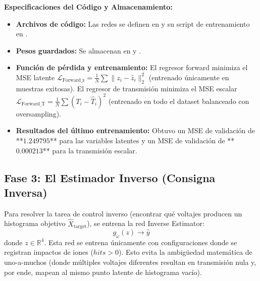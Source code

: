 \documentclass[12pt,letterpaper]{article}
\begin{document}
\textbf{Especificaciones del Código y Almacenamiento:}
\begin{itemize}
    \item \textbf{Archivos de código:} Las redes se definen en  y su script de entrenamiento en .
    \item \textbf{Pesos guardados:} Se almacenan en  y .
    \item \textbf{Función de pérdida y entrenamiento:} El regresor forward minimiza el MSE latente $\mathcal{L}_{\text{Forward\_z}} = \frac{1}{N} \sum \|z_i - \hat{z}_i\|_2^2$ (entrenado únicamente en muestras exitosas). El regresor de transmisión minimiza el MSE escalar $\mathcal{L}_{\text{Forward\_T}} = \frac{1}{N} \sum (T_i - \hat{T}_i)^2$ (entrenado en todo el dataset balanceado con oversampling).
    \item \textbf{Resultados del último entrenamiento:} Obtuvo un MSE de validación de **$1.249795$** para las variables latentes y un MSE de validación de **$0.000213$** para la transmisión escalar.
\end{itemize}

\subsection{Fase 3: El Estimador Inverso (Consigna Inversa)}
Para resolver la tarea de control inverso (encontrar qué voltajes producen un histograma objetivo $\hat{X}_{\text{target}}$), se entrena la red Inverse Estimator:
\begin{equation}
    g_\omega(z) \rightarrow \hat{y}
\end{equation}
donde $z \in \mathbb{R}^4$. Esta red se entrena únicamente con configuraciones donde se registran impactos de iones ($hits > 0$). Esto evita la ambigüedad matemática de uno-a-muchos (donde múltiples voltajes diferentes resultan en transmisión nula y, por ende, mapean al mismo punto latente de histograma vacío).
\end{document}

